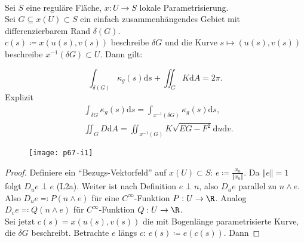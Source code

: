 \begin{theorem}
  \ \\
  Sei $ S $ eine reguläre Fläche, $ x: U \to S $ lokale Parametrisierung. \\
  Sei $ G \subseteq x(U) \subset S $ ein einfach zusammenhängendes Gebiet mit differenzierbarem Rand $ \delta(G) $. \\
  $ c(s) \coloneqq x(u(s), v(s)) $ beschreibe $ \delta G $ und die Kurve $ s \mapsto (u(s), v(s)) $ beschreibe $ x^{-1}(\delta G) \subset U $. Dann gilt:

  \begin{minipage}{.6\textwidth}
    \begin{equation*}
      \int_{\delta(G)}\kappa_g(s)\text{d}s + \iint_G K\text{d}A = 2\pi\text{.}
    \end{equation*}  
    Explizit
    \begin{align*}
      &\int_{\delta G}\kappa_g(s)\text{d} s = \int_{x^{-1}(\delta G)} \kappa_g(s)\text{d} s\text{,} \\
      &\iint_{G}D\text{d}A = \iint_{x^{-1}(G)}K\sqrt{EG - F^2}\text{d}u\text{d}v\text{.}
    \end{align*}
  \end{minipage}
  \hfill
  \begin{minipage}{.375\textwidth}
    \begin{figure}[H]
      \texttt{[image: p67-i1]}
    \end{figure}
  \end{minipage}
  \begin{proof}
    Definiere ein ``Bezugs-Vektorfeld'' auf $ x(U) \subset S $: $ e \coloneqq \frac{x_u}{\left\Vert x_u \right\Vert} $. Da $ \left\Vert e \right\Vert = 1 $ folgt $ D_ue \perp e $ (L2a). Weiter ist nach Definition $ e \perp n $, also $ D_ue $ parallel zu $ n \wedge e $. Also $ D_u e \eqqcolon P(n \wedge e) $ für eine $ C^\infty $-Funktion $ P : U \to \R $. Analog $ D_ve \eqqcolon Q(n \wedge e) $ für $ C^\infty $-Funktion $ Q: U \to \R $. \\
    Sei jetzt $ c(s) = x(u(s),v(s)) $ die mit Bogenlänge parametrisierte Kurve, die $ \delta G $ beschreibt. Betrachte $ e $ längs $ c $: $ e(s) \coloneqq e(c(s)) $. Dann


\end{proof}
\end{theorem}
